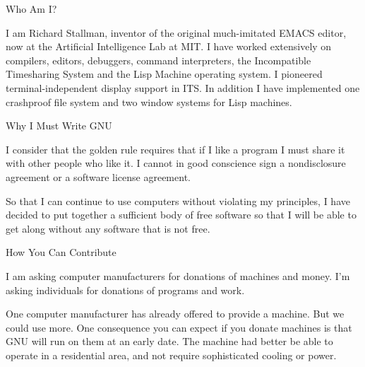 \begin{quot}
\medskip

Who Am I?

\medskip

I am Richard Stallman, inventor of the original much-imitated EMACS
editor, now at the Artificial Intelligence Lab at MIT. I have worked
extensively on compilers, editors, debuggers, command interpreters,
the Incompatible Timesharing System and the Lisp Machine operating
system.  I pioneered terminal-independent display support in ITS. In
addition I have implemented one crashproof file system and two window
systems for Lisp machines.

\medskip

Why I Must Write GNU

\medskip

I consider that the golden rule requires that if I like a program I
must share it with other people who like it. I cannot in good
conscience sign a nondisclosure agreement or a software license
agreement.

\medskip

So that I can continue to use computers without violating my
principles, I have decided to put together a sufficient body of free
software so that I will be able to get along without any software that
is not free.

\medskip

How You Can Contribute

\medskip

I am asking computer manufacturers for donations of machines and
money.  I'm asking individuals for donations of programs and work.

\medskip

One computer manufacturer has already offered to provide a
machine. But we could use more. One consequence you can expect if you
donate machines is that GNU will run on them at an early date. The
machine had better be able to operate in a residential area, and not
require sophisticated cooling or power.

\medskip


\end{quot}

